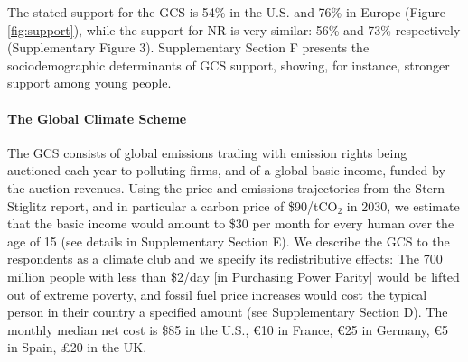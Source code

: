 The stated support for the GCS is 54\% in the U.S. and 76\% in Europe (Figure \ref{fig:support}), %
while the support for NR is very similar: 56\% and 73\% respectively (Supplementary Figure 3). Supplementary Section F presents the sociodemographic determinants of GCS support, showing, for instance, stronger support among young people.

\begin{tcolorbox}\label{box:GCS}
  \paragraph{The Global Climate Scheme} The GCS consists of global emissions trading with emission rights being auctioned each year to polluting firms, and of a global basic income, funded by the auction revenues. Using the price and emissions trajectories from the Stern-Stiglitz report,\cite{stern_report_2017} and in particular a carbon price of \$90/tCO$_\text{2}$ in 2030, we estimate that the basic income would amount to \$30 per month for every human over the age of 15 (see details in Supplementary Section E). %
  We describe the GCS to the respondents as a climate club and we specify its redistributive effects: The 700 million people with less than \$2/day [in Purchasing Power Parity] %
  would be lifted out of extreme poverty, and fossil fuel price increases would cost the typical person in their country a specified amount (see Supplementary Section D). The monthly median net cost is \$85 in the U.S., \euro{}10 in France, \euro{}25 in Germany, \euro{}5 in Spain, £20 in the UK.
\end{tcolorbox}

